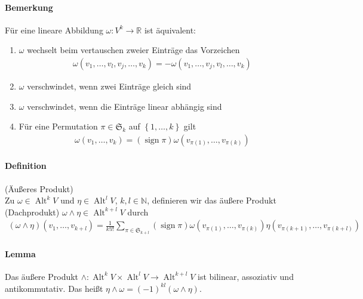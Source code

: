 \documentclass[12pt,a4paper,fleqn]{article}
\def\set#1{{\left\{ #1 \right\}}}
\def\R{{\mathbb{R}}}
\begin{document}
\paragraph{Bemerkung} Für eine lineare Abbildung $\omega\colon V^k \rightarrow \R$ ist äquivalent:
\begin{enumerate}
\item $\omega$ wechselt beim vertauschen zweier Einträge das Vorzeichen
\begin{align*}
\omega(v_1, \dotsc, v_l, v_j, \dotsc, v_k) = -\omega(v_1, \dotsc, v_j, v_l, \dotsc, v_k)
\end{align*}
\item $\omega$ verschwindet, wenn zwei Einträge gleich sind
\item $\omega$ verschwindet, wenn die Einträge linear abhängig sind
\item Für eine Permutation $\pi \in \mathfrak{S}_k$ auf $\set{1, \dotsc, k}$ gilt
\begin{align*}
\omega(v_1, \dotsc, v_k) = (\operatorname{sign} \pi)\omega(v_{\pi(1)}, \dotsc, v_{\pi(k)})
\end{align*}
\end{enumerate}

\paragraph{Definition} (Äußeres Produkt)\\
Zu $\omega \in \operatorname{Alt}^k V$ und $\eta \in \operatorname{Alt}^l V$, $k, l \in \mathbb{N}$, definieren wir das äußere Produkt (Dachprodukt) $\omega \wedge \eta \in \operatorname{Alt}^{k + l} V$ durch
\begin{align*}
(\omega \wedge \eta)(v_1, \dotsc, v_{k+l}) = \frac{1}{k! l!} \sum_{\pi \in\mathfrak{S}_{k+l}} (\operatorname{sign}\pi)\omega(v_{\pi(1)}, \dotsc, v_{\pi(k)})\eta(v_{\pi(k+1)}, \dotsc, v_{\pi(k+l)})
\end{align*}

\paragraph{Lemma} Das äußere Produkt $\wedge\colon \operatorname{Alt}^k V \times \operatorname{Alt}^l V \rightarrow \operatorname{Alt}^{k+l} V$ ist bilinear, assoziativ und antikommutativ. Das heißt $\eta \wedge \omega = (-1)^{kl}(\omega \wedge \eta)$.
\end{document}
